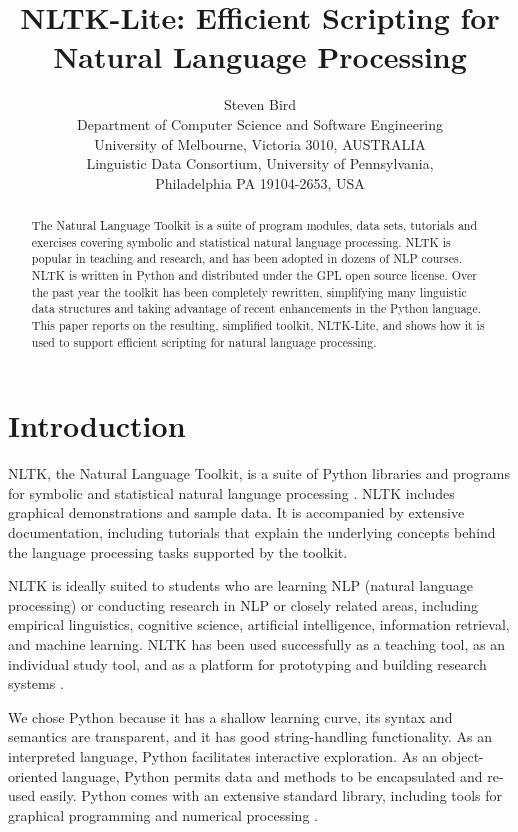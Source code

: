 \documentclass[11pt]{article}
\title{NLTK-Lite: Efficient Scripting for Natural Language Processing}
\author{Steven Bird\\[.5ex]
  Department of Computer Science and Software Engineering\\
  University of Melbourne, Victoria 3010, AUSTRALIA\\[.5ex]
  Linguistic Data Consortium, University of Pennsylvania,\\
  Philadelphia PA 19104-2653, USA}
\date{}
\begin{document}
\maketitle
\begin{abstract}
  The Natural Language Toolkit is a suite of program modules, data
  sets, tutorials and exercises covering symbolic and statistical
  natural language processing.  NLTK is popular in teaching and
  research, and has been adopted in dozens of NLP courses.  NLTK is
  written in Python and distributed under the GPL open source license.
  Over the past year the toolkit has been completely rewritten,
  simplifying many linguistic data structures and taking advantage of
  recent enhancements in the Python language.  This paper reports on
  the resulting, simplified toolkit, NLTK-Lite, and shows how it is
  used to support efficient scripting for natural language processing.
\end{abstract}

\section{Introduction}

NLTK, the Natural Language Toolkit, is a suite of Python libraries and
programs for symbolic and statistical natural language processing
\cite{LoperBird02,Loper04}.
NLTK includes graphical demonstrations and sample data. It is
accompanied by extensive documentation, including tutorials that
explain the underlying concepts behind the language processing tasks
supported by the toolkit.

NLTK is ideally suited to students who are learning NLP (natural
language processing) or conducting research in NLP or closely related
areas, including empirical linguistics, cognitive science, artificial
intelligence, information retrieval, and machine learning. NLTK has
been used successfully as a teaching tool, as an individual study
tool, and as a platform for prototyping and building research systems
\cite{Liddy05,Satre05}.

We chose Python because it has a shallow learning curve, its syntax
and semantics are transparent, and it has good string-handling
functionality.  As an interpreted language, Python facilitates
interactive exploration.  As an object-oriented language, Python
permits data and methods to be encapsulated and re-used easily.
Python comes with an extensive standard library, including tools for
graphical programming and numerical processing
\cite{Rossum03intro,Rossum03ref}.
\end{document}

